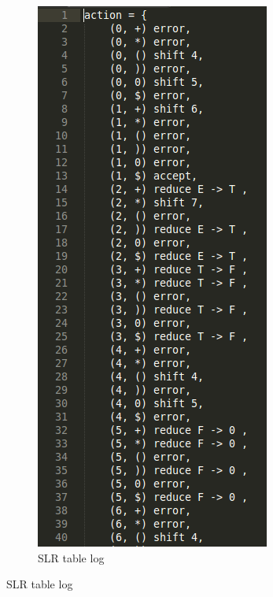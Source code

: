 \documentclass{beamer}
\begin{document}
\begin{frame}
\begin{figure}
\begin{subfigure}[b]{0.3\textwidth}
        \includegraphics[height=0.8\textheight]{LogSLRTable.png}
        \caption{SLR table log}
        \label{fig:slrtable}
    \end{subfigure}
\end{figure}
\end{frame}
\end{document}
